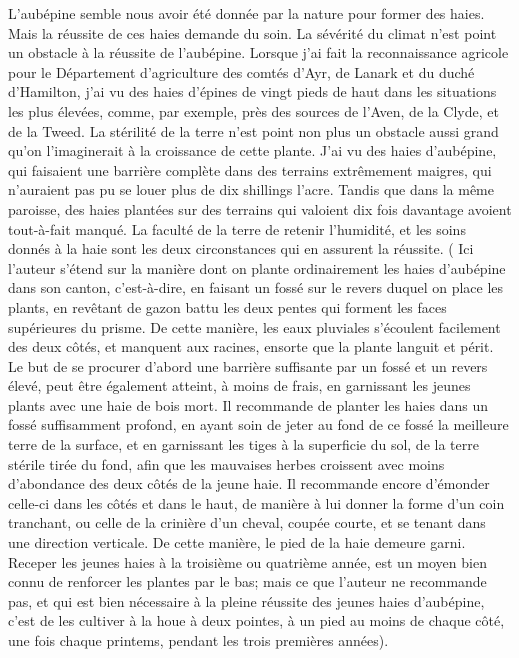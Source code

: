 L'aubépine semble nous avoir été donnée par la nature pour former des haies. Mais la réussite de ces haies demande du soin. La sévérité du climat n'est point un obstacle à la réussite de l'aubépine. Lorsque j'ai fait la reconnaissance agricole pour le Département d'agriculture des comtés d'Ayr, de Lanark et\setcounter{page}{291} du duché d’Hamilton, j’ai vu des haies d’épines de vingt pieds de haut dans les situations les plus élevées, comme, par exemple, près des sources de l’Aven, de la Clyde, et de la Tweed. La stérilité de la terre n’est point non plus un obstacle aussi grand qu’on l’imaginerait à la croissance de cette plante. J’ai vu des haies d’aubépine, qui faisaient une barrière complète dans des terrains extrêmement maigres, qui n’auraient pas pu se louer plus de dix shillings l’acre. Tandis que dans la même paroisse, des haies plantées sur des terrains qui valoient dix fois davantage avoient tout-à-fait manqué. La faculté de la terre de retenir l’humidité, et les soins donnés à la haie sont les deux circonstances qui en assurent la réussite.
( Ici l’auteur s’étend sur la manière dont on plante ordinairement les haies d’aubépine dans son canton, c’est-à-dire, en faisant un fossé sur le revers duquel on place les plants, en revêtant de gazon battu les deux pentes qui forment les faces supérieures du prisme. De cette manière, les eaux pluviales s’écoulent facilement des deux côtés, et manquent aux racines, ensorte que la plante languit et périt. Le but de se procurer d’abord une barrière suffisante par un fossé et un revers élevé, peut être également atteint, à moins\setcounter{page}{292} de frais, en garnissant les jeunes plants avec une haie de bois mort. Il recommande de planter les haies dans un fossé suffisamment profond, en ayant soin de jeter au fond de ce fossé la meilleure terre de la surface, et en garnissant les tiges à la superficie du sol, de la terre stérile tirée du fond, afin que les mauvaises herbes croissent avec moins d'abondance des deux côtés de la jeune haie. Il recommande encore d'émonder celle-ci dans les côtés et dans le haut, de manière à lui donner la forme d'un coin tranchant, ou celle de la crinière d'un cheval, coupée courte, et se tenant dans une direction verticale. De cette manière, le pied de la haie demeure garni. Receper les jeunes haies à la troisième ou quatrième année, est un moyen bien connu de renforcer les plantes par le bas; mais ce que l'auteur ne recommande pas, et qui est bien nécessaire à la pleine réussite des jeunes haies d'aubépine, c'est de les cultiver à la houe à deux pointes, à un pied au moins de chaque côté, une fois chaque printems, pendant les trois premières années).